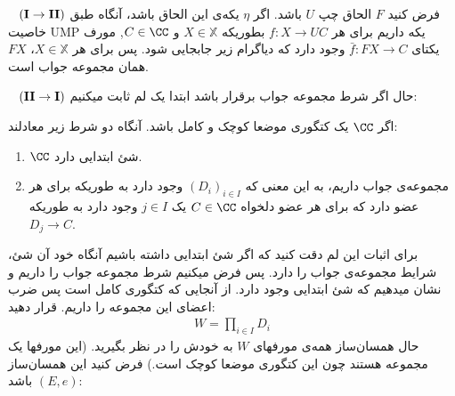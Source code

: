 $\hspace{0.3cm} (\mathbf{I} \to \mathbf{II})$ فرض کنید $F$ الحاق چپ $U$ باشد.
اگر $\eta$ یکه‌ی این الحاق باشد، آنگاه طبق خاصیت UMP یکه داریم برای هر $f: X \to UC$ بطوریکه $X \in \mathbb{X}$ و 
$C \in \CC$, مورف یکتای $\bar{f}: FX \to C$ وجود دارد که دیاگرام زیر جابجایی شود.
پس برای هر $X \in \mathbb{X}$، $FX$ همان مجموعه جواب است.
\begin{center}
\end{center} 
$\hspace{0.3cm} (\mathbf{II} \to \mathbf{I})$ حال اگر شرط مجموعه جواب برقرار باشد ابتدا یک لم ثابت میکنیم:
\begin{lemma}
    اگر $\CC$ یک کتگوری موضعا کوچک و کامل باشد. آنگاه دو شرط زیر معادلند:
    \begin{enumerate}
        \item $\CC$ شئ ابتدایی دارد.
        \item مجموعه‌ی جواب داریم، به این معنی که $(D_i)_{i \in I}$ وجود دارد به طوریکه برای هر عضو دارد که برای هر عضو 
        دلخواه $C \in \CC$ یک $j \in I$ وجود دارد به طوریکه $D_j \to C$.
    \end{enumerate}
\end{lemma} 
برای اثبات این لم دقت کنید که اگر شئ ابتدایی داشته باشیم آنگاه خود آن شئ، شرایط مجموعه‌‌ی جواب را دارد.
پس فرض میکنیم شرط مجموعه جواب را داریم و نشان میدهیم که شئ ابتدایی وجود دارد.
از آنجایی که کتگوری کامل است پس ضرب اعضای این مجموعه را داریم. قرار دهید:
\begin{gather*}
    W = \prod_{i \in I} D_i
\end{gather*}
حال همسان‌ساز همه‌ی مورفهای $W$ به خودش را در نظر بگیرید. (این مورفها یک مجموعه هستند چون این کتگوری موضعا کوچک است.)
فرض کنید این همسان‌‌ساز $(E, e)$ باشد:
\begin{center}
\end{center}
